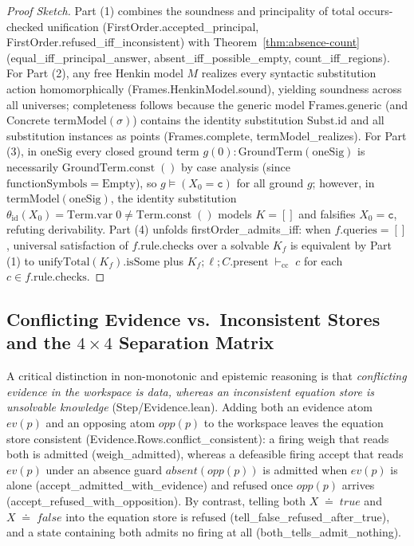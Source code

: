 \documentclass[11pt,a4paper]{article}
\theoremstyle{definition}
\DeclareRobustCommand{\lean}[1]{%
  \ifmmode\text{\normalfont\ttfamily\footnotesize\detokenize{#1}}%
  \else{\normalfont\footnotesize\leanurl{#1}}\fi}
\DeclareRobustCommand{\metta}[1]{\text{\normalfont\ttfamily\footnotesize #1}}
\def\lean#1{#1}%
\def\metta#1{#1}%
\newcommand{\ccseq}{\;\vdash_{\mathrm{cc}}\;}
\newcommand{\doteqStore}{\;\doteq\;}
\begin{document}
\begin{proof}[Proof Sketch]
Part (1) combines the soundness and principality of total occurs-checked unification (\lean{FirstOrder.accepted_principal}, \lean{FirstOrder.refused_iff_inconsistent}) with Theorem~\ref{thm:absence-count} (\lean{equal_iff_principal_answer}, \lean{absent_iff_possible_empty}, \lean{count_iff_regions}).
For Part (2), any free Henkin model $M$ realizes every syntactic substitution action homomorphically (\lean{Frames.HenkinModel.sound}), yielding soundness across all universes; completeness follows because the generic model $\mathrm{Frames.generic}$ (and Concrete $\mathrm{termModel}(\sigma)$) contains the identity substitution $\mathrm{Subst.id}$ and all substitution instances as points (\lean{Frames.complete}, \lean{termModel_realizes}).
For Part (3), in $\mathrm{oneSig}$ every closed ground term $g(0) : \mathrm{GroundTerm}(\mathrm{oneSig})$ is necessarily $\mathrm{GroundTerm.const}\;()$ by case analysis (since $\mathrm{functionSymbols} = \mathrm{Empty}$), so $g \models (X_0 = \mathtt{c})$ for all ground $g$; however, in $\mathrm{termModel}(\mathrm{oneSig})$, the identity substitution $\theta_{\mathrm{id}}(X_0) = \mathrm{Term.var}\;0 \neq \mathrm{Term.const}\;()$ models $K = []$ and falsifies $X_0 = \mathtt{c}$, refuting derivability.
Part (4) unfolds \lean{firstOrder_admits_iff}: when $f.\mathrm{queries} = []$, universal satisfaction of $f.\mathrm{rule}.\mathrm{checks}$ over a solvable $K_f$ is equivalent by Part (1) to $\mathrm{unifyTotal}(K_f).\mathrm{isSome}$ plus $K_f; \ell; C.\mathrm{present} \ccseq c$ for each $c \in f.\mathrm{rule}.\mathrm{checks}$.
\end{proof}

\subsection{Conflicting Evidence vs.\ Inconsistent Stores and the \texorpdfstring{$4 \times 4$}{4x4} Separation Matrix}
\label{subsec:evidence}

A critical distinction in non-monotonic and epistemic reasoning is that \emph{conflicting evidence in the workspace is data, whereas an inconsistent equation store is unsolvable knowledge} (\lean{Step/Evidence.lean}). Adding both an evidence atom $\metta{ev(p)}$ and an opposing atom $\metta{opp(p)}$ to the workspace leaves the equation store consistent (\lean{Evidence.Rows.conflict_consistent}): a firing \lean{weigh} that reads both is admitted (\lean{weigh_admitted}), whereas a defeasible firing \lean{accept} that reads $\metta{ev(p)}$ under an absence guard $\metta{absent(opp(p))}$ is admitted when $\metta{ev(p)}$ is alone (\lean{accept_admitted_with_evidence}) and refused once $\metta{opp(p)}$ arrives (\lean{accept_refused_with_opposition}). By contrast, telling both $X \doteqStore \metta{true}$ and $X \doteqStore \metta{false}$ into the equation store is refused (\lean{tell_false_refused_after_true}), and a state containing both admits no firing at all (\lean{both_tells_admit_nothing}).
\end{document}
